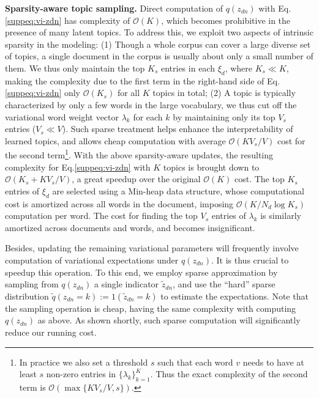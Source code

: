 \documentclass[sigconf]{acmart}
\renewcommand*{\bm}[1]{#1}%
\begin{document}
\begin{appendices}
\textbf{Sparsity-aware topic sampling.} Direct computation of $q(z_{dn})$ with Eq.\eqref{suppeq:vi-zdn} has complexity of $\mathcal{O}(K)$, which becomes prohibitive in the presence of many latent topics. To address this, we exploit two aspects of intrinsic sparsity in the modeling: (1) Though a whole corpus can cover a large diverse set of topics, a single document in the corpus is usually about only a small number of them. We thus only maintain the top $K_s$ entries in each $\bm{\xi}_d$, where $K_s \ll K$, 
making the complexity due to the first term in the right-hand side of Eq.\eqref{suppeq:vi-zdn} only $\mathcal{O}(K_s)$ for all $K$ topics in total; 
(2) A topic is typically characterized by only a few words in the large vocabulary, we thus cut off the variational word weight vector $\bm{\lambda}_k$ for each $k$ by maintaining only its top $V_s$ entries ($V_s \ll V$). Such sparse treatment helps enhance the interpretability of learned topics, 
and allows cheap computation with average $\mathcal{O}(KV_s/V)$ cost for the second term\footnote{In practice we also set a threshold $s$ such that each word $v$ needs to have at least $s$ non-zero entries in $\{\lambda_{k}\}_{k=1}^{K}$. Thus the exact complexity of the second term is $\mathcal{O}(\max\{KV_s/V, s\})$.}.
With the above sparsity-aware updates, the resulting complexity for Eq.\eqref{suppeq:vi-zdn} with $K$ topics is brought down to  $\mathcal{O}(K_s+KV_s/V)$, a great speedup over the original $\mathcal{O}(K)$ cost. The top $K_s$ entries of $\bm{\xi}_d$ are selected using a Min-heap data structure, whose computational cost is amortized across all words in the document, imposing $\mathcal{O}(K/N_d\log K_s)$ computation per word. The cost for finding the top $V_s$ entries of $\bm{\lambda}_k$ is similarly amortized across documents and words, and becomes insignificant. 

Besides, updating the remaining variational parameters will frequently involve computation of variational expectations under $q(z_{dn})$. It is thus crucial to speedup this operation. To this end, we employ sparse approximation by sampling from $q(z_{dn})$ a single indicator $\tilde{z}_{dn}$, and use the ``hard'' sparse distribution $\tilde{q}(z_{dn}=k):=\bm{1}(\tilde{z}_{dn}=k)$ to estimate the expectations. Note that the sampling operation is cheap, having the same complexity with computing $q(z_{dn})$ as above. As shown shortly, such sparse computation will significantly reduce our running cost.


\end{appendices}
\end{document}
